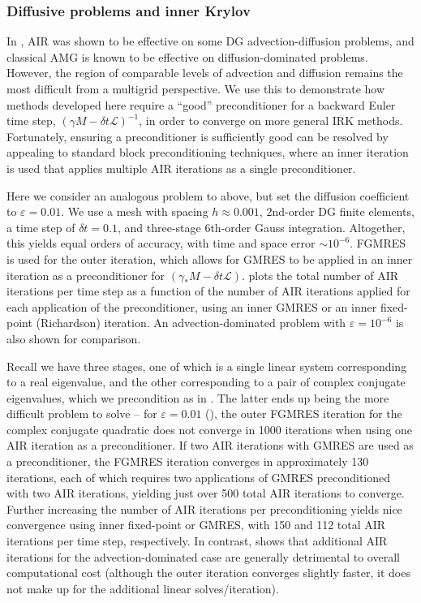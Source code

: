 \documentclass[review]{siamart}
\begin{document}
\subsubsection{Diffusive problems and inner Krylov}\label{sec:numerics:dg:diff}

In \cite{Manteuffel:2019}, AIR was shown to be effective on some DG advection-diffusion
problems, and classical AMG is known to be effective on diffusion-dominated
problems. However, the region of comparable levels of advection and diffusion
remains the most difficult from a multigrid perspective. We use this to
demonstrate how methods developed here require a ``good'' preconditioner
for a backward Euler time step, $(\gamma M - \delta t \mathcal{L})^{-1}$,
in order to converge on more general IRK
methods. Fortunately, ensuring a preconditioner is sufficiently good can be
resolved by appealing to standard block preconditioning techniques, where an inner
iteration is used that applies multiple AIR iterations as a single preconditioner.

Here we consider an analogous problem to above, but set the diffusion coefficient
to $\varepsilon = 0.01$. We use a mesh with spacing $h \approx 0.001$, 2nd-order
DG finite elements, a time step of $\delta t = 0.1$, and three-stage 6th-order
Gauss integration. Altogether, this yields equal orders of accuracy, with time and
space error $\sim10^{-6}$. FGMRES \cite{saad1993flexible} is used for the
outer iteration, which allows for GMRES to be applied in an inner iteration
as a preconditioner for $(\gamma_* M - \delta t \mathcal{L})$.  plots the
total number of AIR iterations per time step as a function of the number of
AIR iterations applied for each application of the preconditioner, using an
inner GMRES or an inner fixed-point (Richardson) iteration. An advection-dominated
problem with $\varepsilon = 10^{-6}$ is also shown for comparison.

Recall we have three stages, one of which is a single linear system corresponding
to a real eigenvalue, and the other corresponding to a pair of complex conjugate
eigenvalues, which we precondition as in . The latter ends up being
the more difficult problem to solve -- for $\varepsilon =0.01$ (),
the outer FGMRES iteration for the complex conjugate quadratic does not converge in
1000 iterations when using one AIR iteration as a preconditioner.
If two AIR iterations with GMRES are used as a preconditioner,
the FGMRES iteration converges in approximately 130 iterations, each of which
requires two applications of GMRES preconditioned with two AIR iterations,
yielding just over 500 total AIR iterations to converge. Further increasing
the number of AIR iterations per preconditioning yields nice convergence
using inner fixed-point or GMRES, with 150 and 112 total AIR iterations per
time step, respectively. In contrast,  shows that
additional AIR iterations for the advection-dominated case are generally
detrimental to overall computational cost (although the outer iteration
converges slightly faster, it does not make up for the additional linear
solves/iteration).
\end{document}
